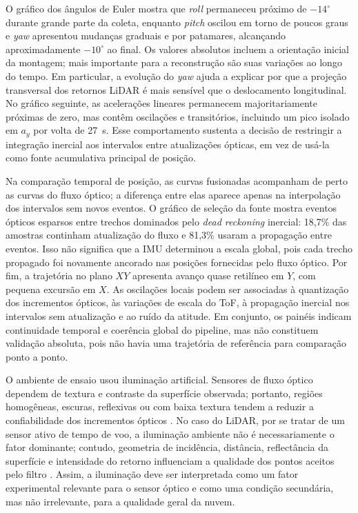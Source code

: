 O gráfico dos ângulos de Euler mostra que \textit{roll} permaneceu próximo de $-14^\circ$ durante grande parte da coleta, enquanto \textit{pitch} oscilou em torno de poucos graus e \textit{yaw} apresentou mudanças graduais e por patamares, alcançando aproximadamente $-10^\circ$ ao final. Os valores absolutos incluem a orientação inicial da montagem; mais importante para a reconstrução são suas variações ao longo do tempo. Em particular, a evolução do \textit{yaw} ajuda a explicar por que a projeção transversal dos retornos LiDAR é mais sensível que o deslocamento longitudinal. No gráfico seguinte, as acelerações lineares permanecem majoritariamente próximas de zero, mas contêm oscilações e transitórios, incluindo um pico isolado em $a_y$ por volta de 27~s. Esse comportamento sustenta a decisão de restringir a integração inercial aos intervalos entre atualizações ópticas, em vez de usá-la como fonte acumulativa principal de posição.

Na comparação temporal de posição, as curvas fusionadas acompanham de perto as curvas do fluxo óptico; a diferença entre elas aparece apenas na interpolação dos intervalos sem novos eventos. O gráfico de seleção da fonte mostra eventos ópticos esparsos entre trechos dominados pelo \textit{dead reckoning} inercial: 18,7\% das amostras continham atualização do fluxo e 81,3\% usaram a propagação entre eventos. Isso não significa que a IMU determinou a escala global, pois cada trecho propagado foi novamente ancorado nas posições fornecidas pelo fluxo óptico. Por fim, a trajetória no plano $XY$ apresenta avanço quase retilíneo em $Y$, com pequena excursão em $X$. As oscilações locais podem ser associadas à quantização dos incrementos ópticos, às variações de escala do ToF, à propagação inercial nos intervalos sem atualização e ao ruído da atitude. Em conjunto, os painéis indicam continuidade temporal e coerência global do pipeline, mas não constituem validação absoluta, pois não havia uma trajetória de referência para comparação ponto a ponto.

O ambiente de ensaio usou iluminação artificial. Sensores de fluxo óptico dependem de textura e contraste da superfície observada; portanto, regiões homogêneas, escuras, reflexivas ou com baixa textura tendem a reduzir a confiabilidade dos incrementos ópticos \parencite{lucasKanade1981,pixart2017pmw3901}. No caso do LiDAR, por se tratar de um sensor ativo de tempo de voo, a iluminação ambiente não é necessariamente o fator dominante; contudo, geometria de incidência, distância, reflectância da superfície e intensidade do retorno influenciam a qualidade dos pontos aceitos pelo filtro \parencite{ldrobot2019ld06}. Assim, a iluminação deve ser interpretada como um fator experimental relevante para o sensor óptico e como uma condição secundária, mas não irrelevante, para a qualidade geral da nuvem.

